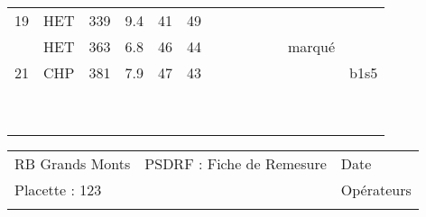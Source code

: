 \documentclass[a4paper, landscape]{article}\usepackage[]{graphicx}\usepackage[]{color}
\begin{document}
{\begin{tabular}{|p{1cm}|p{2cm}|p{1.6cm}|p{1.6cm}|p{1.6cm}|p{1.6cm}|p{1.5cm}|p{1.5cm}|p{1.5cm}|p{1.5cm}|p{1.5cm}|p{7.5cm}|p{5cm}|}
19 & HET & 339 & 9.4 & 41 & 49 &  &  &  &  &  &  &  \\ 
   \rowcolor[gray]{0.95} \hline
20 & HET & 363 & 6.8 & 46 & 44 &  &  &  &  &  & marqué &  \\ 
   \hline
21 & CHP & 381 & 7.9 & 47 & 43 &  &  &  &  &  &  & b1s5 \\ 
   \rowcolor[gray]{0.95} \hline
 &  &  &  &  &  &  &  &  &  &  &  &  \\ 
   \hline
 &  &  &  &  &  &  &  &  &  &  &  &  \\ 
   \rowcolor[gray]{0.95} \hline
 &  &  &  &  &  &  &  &  &  &  &  &  \\ 
   \hline
 &  &  &  &  &  &  &  &  &  &  &  &  \\ 
   \rowcolor[gray]{0.95} \hline
 &  &  &  &  &  &  &  &  &  &  &  &  \\ 
   \hline
 &  &  &  &  &  &  &  &  &  &  &  &  \\ 
   \rowcolor[gray]{0.95} \hline
 &  &  &  &  &  &  &  &  &  &  &  &  \\ 
   \hline
 &  &  &  &  &  &  &  &  &  &  &  &  \\ 
   \rowcolor[gray]{0.95} \hline
 &  &  &  &  &  &  &  &  &  &  &  &  \\ 
   \hline
\end{tabular}
}

\begin{tabular}{p{10cm}p{10cm}p{8cm}}
  RB Grands Monts & PSDRF : Fiche de Remesure & Date \\ 
  Placette : 123 &  & Opérateurs \\ 
   &  &  \\ 
  \end{tabular}
\end{document}
